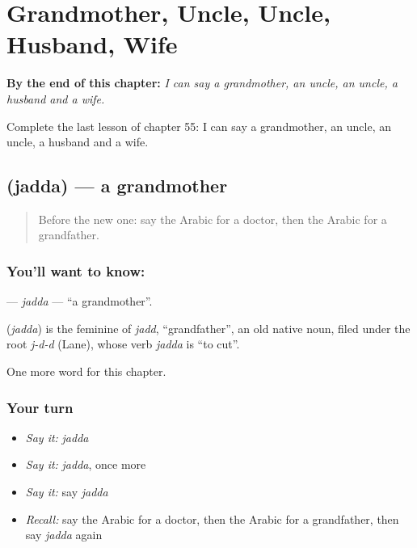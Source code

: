 
\chapter{Grandmother, Uncle, Uncle, Husband, Wife}
\label{ch:ar-grandmother-uncle-uncle-husband-wife}

\begin{chapteropening}
\textbf{By the end of this chapter:} \emph{I can say a grandmother, an uncle, an uncle, a husband and a wife.}

Complete the last lesson of chapter 55: I can say a grandmother, an uncle, an uncle, a husband and a wife.
\end{chapteropening}

\section[\texorpdfstring{\ar{جدة} (jadda)}{جدة (jadda)}]{ (jadda) — a grandmother}

\label{lesson:AR-C55-jadda}



\begin{quote}
Before the new one: say the Arabic for a doctor, then the Arabic for a grandfather.
\end{quote}

\subsection*{You'll want to know: }
\textbf{} — \emph{jadda} — \textquotedblleft{}a grandmother\textquotedblright{}.

\begin{cousinweb}
\textbf{} (\emph{jadda}) is the feminine of \emph{jadd}, \textquotedblleft{}grandfather\textquotedblright{}, an old native noun, filed under the root \emph{j-d-d} (Lane), whose verb \emph{jadda} is \textquotedblleft{}to cut\textquotedblright{}.
\end{cousinweb}

\begin{grammarlens}[title={What you've built}]
One more word for this chapter.
\end{grammarlens}

\subsection*{Your turn}
\begin{itemize}
\raggedright
  \item \emph{Say it:} \emph{jadda}
  \item \emph{Say it:} \emph{jadda}, once more
  \item \emph{Say it:} say \emph{jadda}
  \item \emph{Recall:} say the Arabic for a doctor, then the Arabic for a grandfather, then say \emph{jadda} again
\end{itemize}

